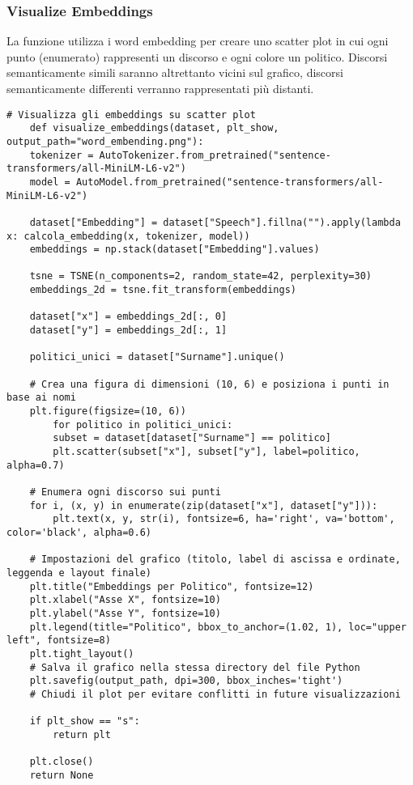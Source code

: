 \documentclass[12pt]{article}
\begin{document}
		\subsubsection{Visualize Embeddings}
La funzione utilizza i word embedding per creare uno scatter plot in cui ogni punto (enumerato) rappresenti un discorso e ogni colore un politico. Discorsi semanticamente simili saranno altrettanto vicini sul grafico, discorsi semanticamente differenti verranno rappresentati più distanti.
	\begin{lstlisting}
# Visualizza gli embeddings su scatter plot
	def visualize_embeddings(dataset, plt_show, output_path="word_embending.png"):
	tokenizer = AutoTokenizer.from_pretrained("sentence-transformers/all-MiniLM-L6-v2")
	model = AutoModel.from_pretrained("sentence-transformers/all-MiniLM-L6-v2")
	
	dataset["Embedding"] = dataset["Speech"].fillna("").apply(lambda x: calcola_embedding(x, tokenizer, model))
	embeddings = np.stack(dataset["Embedding"].values)
	
	tsne = TSNE(n_components=2, random_state=42, perplexity=30)
	embeddings_2d = tsne.fit_transform(embeddings)
	
	dataset["x"] = embeddings_2d[:, 0]
	dataset["y"] = embeddings_2d[:, 1]
	
	politici_unici = dataset["Surname"].unique()
	
	# Crea una figura di dimensioni (10, 6) e posiziona i punti in base ai nomi
	plt.figure(figsize=(10, 6))
		for politico in politici_unici:
		subset = dataset[dataset["Surname"] == politico]
		plt.scatter(subset["x"], subset["y"], label=politico, alpha=0.7)

	# Enumera ogni discorso sui punti 
	for i, (x, y) in enumerate(zip(dataset["x"], dataset["y"])):
		plt.text(x, y, str(i), fontsize=6, ha='right', va='bottom', color='black', alpha=0.6)

	# Impostazioni del grafico (titolo, label di ascissa e ordinate, leggenda e layout finale)
	plt.title("Embeddings per Politico", fontsize=12)
	plt.xlabel("Asse X", fontsize=10)
	plt.ylabel("Asse Y", fontsize=10)
	plt.legend(title="Politico", bbox_to_anchor=(1.02, 1), loc="upper left", fontsize=8)
	plt.tight_layout()
	# Salva il grafico nella stessa directory del file Python
	plt.savefig(output_path, dpi=300, bbox_inches='tight')
	# Chiudi il plot per evitare conflitti in future visualizzazioni
	
	if plt_show == "s":
		return plt
	
	plt.close()
	return None
	\end{lstlisting}
		
\end{document}
